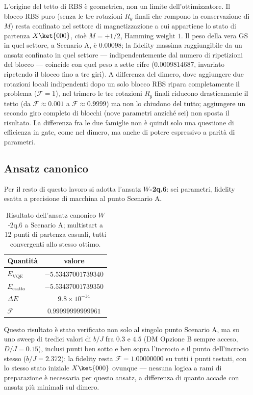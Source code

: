 \documentclass[11pt,a4paper]{article}
\begin{document}
L'origine del tetto di RBS è geometrica, non un limite
dell'ottimizzatore. Il blocco RBS puro (senza le tre rotazioni $R_y$
finali che rompono la conservazione di $M$) resta confinato nel settore
di magnetizzazione a cui appartiene lo stato di partenza $X\ket{000}$,
cioè $M=+1/2$, Hamming weight $1$. Il peso della vera GS in quel settore,
a Scenario A, è $0.00098$; la fidelity massima raggiungibile da un
ansatz confinato in quel settore --- indipendentemente dal numero di
ripetizioni del blocco --- coincide con quel peso a sette cifre
($0.0009814687$, invariato ripetendo il blocco fino a tre giri). A
differenza del dimero, dove aggiungere due rotazioni locali indipendenti
dopo un solo blocco RBS ripara completamente il problema
($\mathcal F=1$), nel trimero le tre rotazioni $R_y$ finali riducono
drasticamente il tetto (da $\mathcal F\approx0.001$ a $\mathcal
F\approx0.9999$) ma non lo chiudono del tutto; aggiungere un secondo giro
completo di blocchi (nove parametri anziché sei) non sposta il risultato.
La differenza fra le due famiglie non è quindi solo una questione di
efficienza in gate, come nel dimero, ma anche di potere espressivo a
parità di parametri.

\subsection{Ansatz canonico}

Per il resto di questo lavoro si adotta l'ansatz \textbf{$W$-2q.6}: sei
parametri, fidelity esatta a precisione di macchina al punto Scenario A.

\begin{table}[htbp]
\centering
\small
\renewcommand{\arraystretch}{1.3}
\begin{tabular}{@{}lc@{}}
\toprule
\rowcolor{grigetto}
\textbf{Quantità} & \textbf{valore} \\
\midrule
$E_\text{VQE}$ & $-5.53437001739340$ \\
$E_\text{esatto}$ & $-5.53437001739350$ \\
$\Delta E$ & $9.8\times10^{-14}$ \\
$\mathcal F$ & $0.99999999999961$ \\
\bottomrule
\end{tabular}
\caption{Risultato dell'ansatz canonico $W$-2q.6 a Scenario A; multistart
a 12 punti di partenza casuali, tutti convergenti allo stesso ottimo.}
\end{table}
\FloatBarrier

Questo risultato è stato verificato non solo al singolo punto Scenario A,
ma su uno sweep di tredici valori di $b/J$ fra $0.3$ e $4.5$ (DM Opzione B
sempre acceso, $D/J=0.15$), inclusi punti ben sotto e ben sopra l'incrocio
e il punto dell'incrocio stesso ($b/J=2.372$): la fidelity resta
$\mathcal F=1.00000000$ su tutti i punti testati, con lo stesso stato
iniziale $X\ket{000}$ ovunque --- nessuna logica a rami di preparazione è
necessaria per questo ansatz, a differenza di quanto accade con ansatz
più minimali sul dimero.
\end{document}
